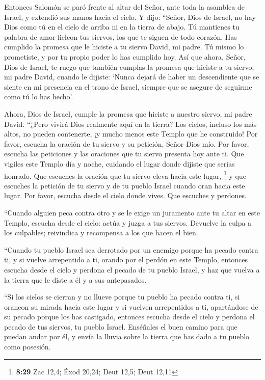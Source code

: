  Entonces Salomón se paró frente al altar del Señor, ante
toda la asamblea de Israel, y extendió sus manos hacia el cielo.
 Y dijo: ``Señor, Dios de Israel, no hay Dios como tú en
el cielo de arriba ni en la tierra de abajo. Tú mantienes tu palabra de
amor fielcon tus siervos, los que te siguen de todo corazón.
 Has cumplido la promesa que le hiciste a tu siervo
David, mi padre. Tú mismo lo prometiste, y por tu propio poder lo has
cumplido hoy.  Así que ahora, Señor, Dios de Israel, te
ruego que también cumplas la promesa que hiciste a tu siervo, mi padre
David, cuando le dijiste: `Nunca dejará de haber un descendiente que se
siente en mi presencia en el trono de Israel, siempre que se asegure de
seguirme como tú lo has hecho'.

 Ahora, Dios de Israel, cumple la promesa que hiciste a
nuestro siervo, mi padre David.  ``¿Pero vivirá Dios
realmente aquí en la tierra? Los cielos, incluso los más altos, no
pueden contenerte, ¡y mucho menos este Templo que he construido!
 Por favor, escucha la oración de tu siervo y su
petición, Señor Dios mío. Por favor, escucha las peticiones y las
oraciones que tu siervo presenta hoy ante ti.  Que
vigiles este Templo día y noche, cuidando el lugar donde dijiste que
serías honrado. Que escuches la oración que tu siervo eleva hacia este
lugar, \footnote{\textbf{8:29} Zac 12,4; Éxod 20,24; Deut 12,5; Deut
  12,11}  y que escuches la petición de tu siervo y de tu
pueblo Israel cuando oran hacia este lugar. Por favor, escucha desde el
cielo donde vives. Que escuches y perdones.

 ``Cuando alguien peca contra otro y se le exige un
juramento ante tu altar en este Templo,  escucha desde el
cielo: actúa y juzga a tus siervos. Devuelve la culpa a los culpables;
reivindica y recompensa a los que hacen el bien.

 ``Cuando tu pueblo Israel sea derrotado por un enemigo
porque ha pecado contra ti, y si vuelve arrepentido a ti, orando por el
perdón en este Templo,  entonces escucha desde el cielo y
perdona el pecado de tu pueblo Israel, y haz que vuelva a la tierra que
le diste a él y a sus antepasados.

 ``Si los cielos se cierran y no llueve porque tu pueblo
ha pecado contra ti, si orancon su mirada hacia este lugar y si vuelven
arrepentidos a ti, apartándose de su pecado porque los has castigado,
 entonces escucha desde el cielo y perdona el pecado de
tus siervos, tu pueblo Israel. Enséñales el buen camino para que puedan
andar por él, y envía la lluvia sobre la tierra que has dado a tu pueblo
como posesión.

